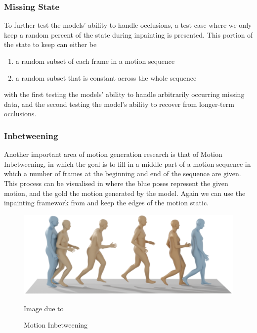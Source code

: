 \subsubsection{Missing State}
To further test the models' ability to handle occlusions, a test case where we only keep a random percent of the state during inpainting is presented. This portion of the state to keep can either be 
\begin{enumerate}
    \item a random subset of each frame in a motion sequence
    \item a random subset that is constant across the whole sequence
\end{enumerate}
with the first testing the models' ability to handle arbitrarily occurring missing data, and the second testing the model's ability to recover from longer-term occlusions.

\subsubsection{Inbetweening}
Another important area of motion generation research is that of Motion Inbetweening, in which the goal is to fill in a middle part of a motion sequence in which a number of frames at the beginning and end of the sequence are given. This process can be visualised in  where the blue poses represent the given motion, and the gold the motion generated by the model. Again we can use the inpainting framework from  and keep the edges of the motion static.

\begin{figure}[!ht]
    \centering
    \includegraphics[width=1\textwidth]{Figures/diffusion/mdm_inbetweening.png}
    \caption{Motion Inbetweening}
    \label{fig:mdm_inbetweening}
    Image due to \cite{MDM}
\end{figure}


